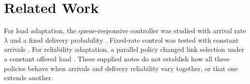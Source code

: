 \section{Related Work}
\label{sec:fixture_related_work}
For load adaptation, the queue-responsive controller was studied with arrival
rate $\lambda$ and a fixed delivery probability \cite{fixtureQueue}.
Fixed-rate control was tested with constant arrivals \cite{fixtureFixed}.
For reliability adaptation, a parallel policy changed link selection under a
constant offered load \cite{fixtureLink}.
These supplied notes do not establish how all three policies behave when
arrivals and delivery reliability vary together, or that one extends another.
